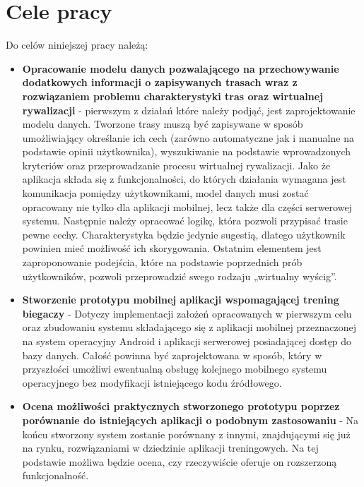 \section{Cele pracy}
Do celów niniejszej pracy należą:
\begin{itemize}
\item \textbf{Opracowanie modelu danych pozwalającego na przechowywanie dodatkowych informacji o zapisywanych trasach wraz z rozwiązaniem problemu charakterystyki tras oraz wirtualnej rywalizacji} - pierwszym z działań które należy podjąć, jest zaprojektowanie modelu danych. Tworzone trasy muszą być zapisywane w sposób umożliwiający określanie ich cech (zarówno automatyczne jak i manualne na podstawie opinii użytkownika), wyszukiwanie na podstawie wprowadzonych kryteriów oraz przeprowadzanie procesu wirtualnej rywalizacji. Jako że aplikacja składa się z funkcjonalności, do których działania wymagana jest komunikacja pomiędzy użytkownikami, model danych musi zostać opracowany nie tylko dla aplikacji mobilnej, lecz także dla części serwerowej systemu. Następnie należy opracować logikę, która pozwoli przypisać trasie pewne cechy. Charakterystyka będzie jedynie sugestią, dlatego użytkownik powinien mieć możliwość ich skorygowania. Ostatnim elementem jest zaproponowanie podejścia, które na podstawie poprzednich prób użytkowników, pozwoli przeprowadzić swego rodzaju „wirtualny wyścig”.
\item \textbf{Stworzenie prototypu mobilnej aplikacji wspomagającej trening biegaczy} - Dotyczy implementacji założeń opracowanych w pierwszym celu oraz zbudowaniu systemu składającego się z aplikacji mobilnej przeznaczonej na system operacyjny Android i aplikacji serwerowej posiadającej dostęp do bazy danych. Całość powinna być zaprojektowana w sposób, który w przyszłości umożliwi ewentualną obsługę kolejnego mobilnego systemu operacyjnego bez modyfikacji istniejącego kodu źródłowego.
\item \textbf{Ocena możliwości praktycznych stworzonego prototypu poprzez porównanie do istniejących aplikacji o podobnym zastosowaniu} - Na końcu stworzony system zostanie porównany z innymi, znajdującymi się już na rynku, rozwiązaniami w dziedzinie aplikacji treningowych. Na tej podstawie możliwa będzie ocena, czy rzeczywiście oferuje on rozszerzoną funkcjonalność.
\end{itemize}

